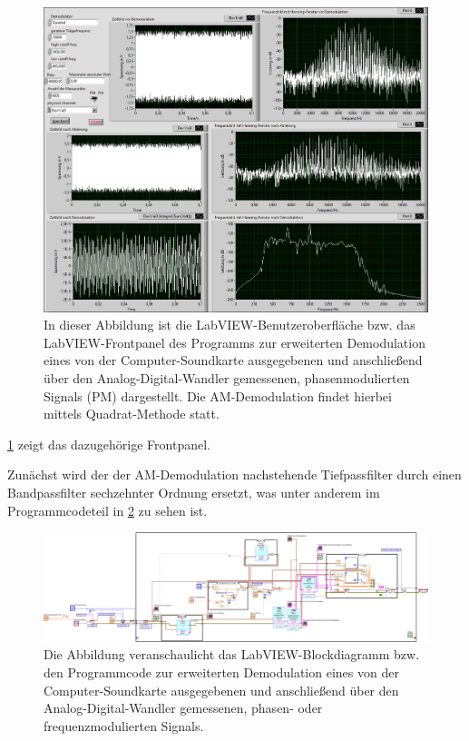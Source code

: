 \documentclass[
a4paper,
12pt,
pagesize,
ngerman
]{scrartcl}
\begin{document}
	\begin{figure}[H]
		\centering
		\includegraphics[width=1.0\textwidth]{EIRE2018Dateien/Tag4/OsziFMPM-Demod/mitBandpassUndIntegrationBilder/OsziPlusFMPMp}
		\caption{In dieser Abbildung ist die LabVIEW-Benutzeroberfläche bzw. das LabVIEW-Frontpanel des Programms zur erweiterten Demodulation eines von der Computer-Soundkarte ausgegebenen und anschließend über den Analog-Digital-Wandler gemessenen, phasenmodulierten Signals (\glqq PM\grqq ) dargestellt. Die AM-Demodulation findet hierbei mittels \glqq Quadrat\grqq -Methode statt.}
		\label{DemodIntBandFrontpanel}
	\end{figure}
	
	\noindent \cref{DemodIntBandFrontpanel} zeigt das dazugehörige Frontpanel.
	
	Zunächst wird der der AM-Demodulation nachstehende Tiefpassfilter durch einen Bandpassfilter sechzehnter Ordnung ersetzt, was unter anderem im Programmcodeteil in \cref{DemodIntBandProgrammcode1} zu sehen ist.
	
	\begin{figure}[H]
		\centering
		\includegraphics[width=1.0\textwidth]{EIRE2018Dateien/Tag4/OsziFMPM-Demod/mitBandpassUndIntegrationBilder/OsziPlusFMPMd}
		\caption{Die Abbildung veranschaulicht das LabVIEW-Blockdiagramm bzw. den Programmcode zur erweiterten Demodulation eines von der Computer-Soundkarte ausgegebenen und anschließend über den Analog-Digital-Wandler gemessenen, phasen- oder frequenzmodulierten Signals.}
		\label{DemodIntBandProgrammcode1}
	\end{figure}
	
\end{document}

